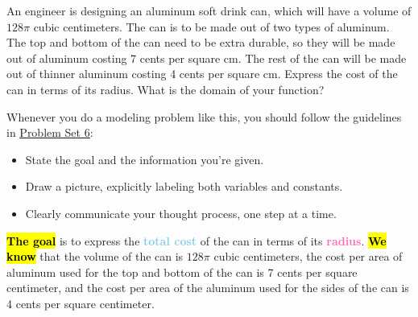 \documentclass{article}
\makeatletter
\let\@href=\href
\renewcommand{\href}[2]{\@href{#1}{\ul{#2}}}
\newcommand{\goal}[1]{\textbf{\textcolor{skyblue}{#1}}}
\newcommand{\indvar}[1]{\textbf{\textcolor{hotpink}{#1}}}
\makeatother
\begin{document}
\begin{enumerate}
  \begin{problem}[\newpage]
    An engineer is designing an aluminum soft drink can, which will have a volume of $128 \pi$ cubic centimeters. The can is to be made out of two types of aluminum. The top and bottom of the can need to be extra durable, so they will be made out of aluminum costing 7 cents per square cm. The rest of the can will be made out of thinner aluminum costing 4 cents per square cm. Express the cost of the can in terms of its radius. What is the domain of your function?

    Whenever you do a modeling problem like this, you should follow the guidelines in \href{https://people.math.harvard.edu/~jjchen/mathma/docs/homework/PS06.html}{Problem Set 6}:
    \begin{itemize}[nosep]
    \item State the goal and the information you're given.
    \item Draw a picture, explicitly labeling both variables and constants.
    \item Clearly communicate your thought process, one step at a time. 
    \end{itemize}
  \end{problem}

  \begin{solution}
    \hl{\textbf{The goal}} is to express the \goal{total cost} of the can in terms of its \indvar{radius}.
    \hl{\textbf{We know}} that the volume of the can is $128\pi$ cubic centimeters, 
    the cost per area of aluminum used for the top and bottom of the can is 7 cents per square centimeter, 
    and the cost per area of the aluminum used for the sides of the can is 4 cents per square centimeter. 


\end{solution}
\end{enumerate}
\end{document}
